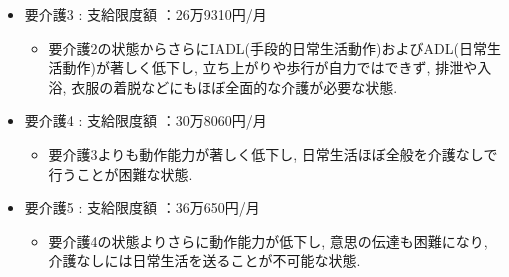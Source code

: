 \begin{itemize}
\begin{itemize}
	      \end{itemize}

	\item 要介護3 : 支給限度額 ：26万9310円/月


	      \begin{itemize} \setlength{\itemsep}{-0.5mm} \setlength{\parskip}{-0.5mm}
		      \item 要介護2の状態からさらにIADL(手段的日常生活動作)およびADL(日常生活動作)が著しく低下し, 立ち上がりや歩行が自力ではできず, 排泄や入浴, 衣服の着脱などにもほぼ全面的な介護が必要な状態.

	      \end{itemize}

	\item 要介護4 : 支給限度額 ：30万8060円/月


	      \begin{itemize} \setlength{\itemsep}{-0.5mm} \setlength{\parskip}{-0.5mm}
		      \item 要介護3よりも動作能力が著しく低下し, 日常生活ほぼ全般を介護なしで行うことが困難な状態.

	      \end{itemize}

	\item 要介護5 : 支給限度額 ：36万650円/月


	      \begin{itemize} \setlength{\itemsep}{-0.5mm} \setlength{\parskip}{-0.5mm}
		      \item 要介護4の状態よりさらに動作能力が低下し, 意思の伝達も困難になり, 介護なしには日常生活を送ることが不可能な状態.

	      \end{itemize}


\end{itemize}












